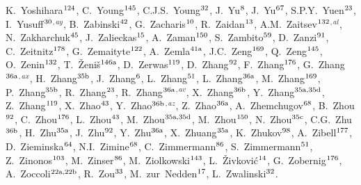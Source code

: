\begin{flushleft}
K.~Yoshihara$^\textrm{\scriptsize 124}$,
C.~Young$^\textrm{\scriptsize 145}$,
C.J.S.~Young$^\textrm{\scriptsize 32}$,
J.~Yu$^\textrm{\scriptsize 8}$,
J.~Yu$^\textrm{\scriptsize 67}$,
S.P.Y.~Yuen$^\textrm{\scriptsize 23}$,
I.~Yusuff$^\textrm{\scriptsize 30}$$^{,ay}$,
B.~Zabinski$^\textrm{\scriptsize 42}$,
G.~Zacharis$^\textrm{\scriptsize 10}$,
R.~Zaidan$^\textrm{\scriptsize 13}$,
A.M.~Zaitsev$^\textrm{\scriptsize 132}$$^{,al}$,
N.~Zakharchuk$^\textrm{\scriptsize 45}$,
J.~Zalieckas$^\textrm{\scriptsize 15}$,
A.~Zaman$^\textrm{\scriptsize 150}$,
S.~Zambito$^\textrm{\scriptsize 59}$,
D.~Zanzi$^\textrm{\scriptsize 91}$,
C.~Zeitnitz$^\textrm{\scriptsize 178}$,
G.~Zemaityte$^\textrm{\scriptsize 122}$,
A.~Zemla$^\textrm{\scriptsize 41a}$,
J.C.~Zeng$^\textrm{\scriptsize 169}$,
Q.~Zeng$^\textrm{\scriptsize 145}$,
O.~Zenin$^\textrm{\scriptsize 132}$,
T.~\v{Z}eni\v{s}$^\textrm{\scriptsize 146a}$,
D.~Zerwas$^\textrm{\scriptsize 119}$,
D.~Zhang$^\textrm{\scriptsize 92}$,
F.~Zhang$^\textrm{\scriptsize 176}$,
G.~Zhang$^\textrm{\scriptsize 36a}$$^{,ax}$,
H.~Zhang$^\textrm{\scriptsize 35b}$,
J.~Zhang$^\textrm{\scriptsize 6}$,
L.~Zhang$^\textrm{\scriptsize 51}$,
L.~Zhang$^\textrm{\scriptsize 36a}$,
M.~Zhang$^\textrm{\scriptsize 169}$,
P.~Zhang$^\textrm{\scriptsize 35b}$,
R.~Zhang$^\textrm{\scriptsize 23}$,
R.~Zhang$^\textrm{\scriptsize 36a}$$^{,av}$,
X.~Zhang$^\textrm{\scriptsize 36b}$,
Y.~Zhang$^\textrm{\scriptsize 35a,35d}$,
Z.~Zhang$^\textrm{\scriptsize 119}$,
X.~Zhao$^\textrm{\scriptsize 43}$,
Y.~Zhao$^\textrm{\scriptsize 36b}$$^{,az}$,
Z.~Zhao$^\textrm{\scriptsize 36a}$,
A.~Zhemchugov$^\textrm{\scriptsize 68}$,
B.~Zhou$^\textrm{\scriptsize 92}$,
C.~Zhou$^\textrm{\scriptsize 176}$,
L.~Zhou$^\textrm{\scriptsize 43}$,
M.~Zhou$^\textrm{\scriptsize 35a,35d}$,
M.~Zhou$^\textrm{\scriptsize 150}$,
N.~Zhou$^\textrm{\scriptsize 35c}$,
C.G.~Zhu$^\textrm{\scriptsize 36b}$,
H.~Zhu$^\textrm{\scriptsize 35a}$,
J.~Zhu$^\textrm{\scriptsize 92}$,
Y.~Zhu$^\textrm{\scriptsize 36a}$,
X.~Zhuang$^\textrm{\scriptsize 35a}$,
K.~Zhukov$^\textrm{\scriptsize 98}$,
A.~Zibell$^\textrm{\scriptsize 177}$,
D.~Zieminska$^\textrm{\scriptsize 64}$,
N.I.~Zimine$^\textrm{\scriptsize 68}$,
C.~Zimmermann$^\textrm{\scriptsize 86}$,
S.~Zimmermann$^\textrm{\scriptsize 51}$,
Z.~Zinonos$^\textrm{\scriptsize 103}$,
M.~Zinser$^\textrm{\scriptsize 86}$,
M.~Ziolkowski$^\textrm{\scriptsize 143}$,
L.~\v{Z}ivkovi\'{c}$^\textrm{\scriptsize 14}$,
G.~Zobernig$^\textrm{\scriptsize 176}$,
A.~Zoccoli$^\textrm{\scriptsize 22a,22b}$,
R.~Zou$^\textrm{\scriptsize 33}$,
M.~zur~Nedden$^\textrm{\scriptsize 17}$,
L.~Zwalinski$^\textrm{\scriptsize 32}$.
$$
\end{flushleft}
